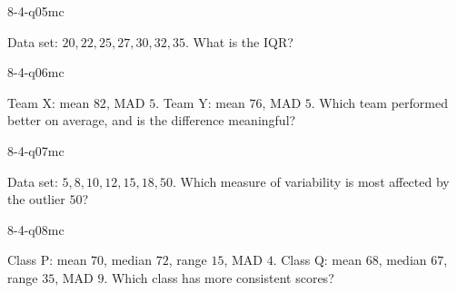 \begin{practiceQuestion}{8-4-q05}{mc}
\begin{questionText}
Data set: $20, 22, 25, 27, 30, 32, 35$. What is the IQR?
\end{questionText}
\end{practiceQuestion}

\begin{practiceQuestion}{8-4-q06}{mc}
\begin{questionText}
Team X: mean $82$, MAD $5$. Team Y: mean $76$, MAD $5$. Which team performed better on average, and is the difference meaningful?
\end{questionText}
\end{practiceQuestion}

\begin{practiceQuestion}{8-4-q07}{mc}
\begin{questionText}
Data set: $5, 8, 10, 12, 15, 18, 50$. Which measure of variability is most affected by the outlier $50$?
\end{questionText}
\end{practiceQuestion}

\begin{practiceQuestion}{8-4-q08}{mc}
\begin{questionText}
Class P: mean $70$, median $72$, range $15$, MAD $4$.
Class Q: mean $68$, median $67$, range $35$, MAD $9$.
Which class has more consistent scores?
\end{questionText}
\end{practiceQuestion}


